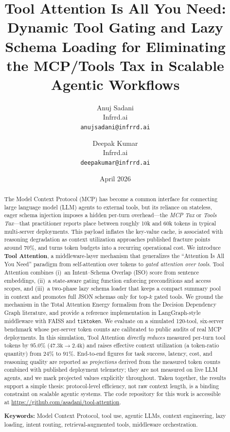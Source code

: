 \documentclass[11pt]{article}
\title{Tool Attention Is All You Need: \\
  Dynamic Tool Gating and Lazy Schema Loading for Eliminating \\
  the MCP/Tools Tax in Scalable Agentic Workflows}
\author{Anuj Sadani \\
  Infrrd.ai \\
  \texttt{anujsadani@infrrd.ai}
  \and
  Deepak Kumar \\
  Infrrd.ai \\
  \texttt{deepakumar@infrrd.ai}}
\date{April 2026}
\begin{document}
\maketitle

\begin{abstract}
The Model Context Protocol (MCP) has become a common interface for connecting large language model (LLM) agents to external tools, but its reliance on stateless, eager schema injection imposes a hidden per-turn overhead---the \emph{MCP Tax} or \emph{Tools Tax}---that practitioner reports place between roughly 10k and 60k tokens in typical multi-server deployments. This payload inflates the key-value cache, is associated with reasoning degradation as context utilization approaches published fracture points around $70\%$, and turns token budgets into a recurring operational cost. We introduce \textbf{Tool Attention}, a middleware-layer mechanism that generalizes the ``Attention Is All You Need'' paradigm from self-attention over tokens to \emph{gated attention over tools}. Tool Attention combines (i)~an Intent--Schema Overlap (ISO) score from sentence embeddings, (ii)~a state-aware gating function enforcing preconditions and access scopes, and (iii)~a two-phase lazy schema loader that keeps a compact summary pool in context and promotes full JSON schemas only for top-$k$ gated tools. We ground the mechanism in the Total Attention Energy formalism from the Decision Dependency Graph literature, and provide a reference implementation in LangGraph-style middleware with FAISS and \texttt{tiktoken}. We evaluate on a simulated 120-tool, six-server benchmark whose per-server token counts are calibrated to public audits of real MCP deployments. In this simulation, Tool Attention \emph{directly reduces} measured per-turn tool tokens by $95.0\%$ ($47.3\text{k}\!\to\!2.4\text{k}$) and raises effective context utilization (a token-ratio quantity) from $24\%$ to $91\%$. End-to-end figures for task success, latency, cost, and reasoning quality are reported as \emph{projections} derived from the measured token counts combined with published deployment telemetry; they are not measured on live LLM agents, and we mark projected values explicitly throughout. Taken together, the results support a simple thesis: protocol-level efficiency, not raw context length, is a binding constraint on scalable agentic systems. The code repository for this work is accessible at \url{https://github.com/asadani/tool-attention}.

\vspace{0.5em}
\noindent\textbf{Keywords:} Model Context Protocol, tool use, agentic LLMs, context engineering, lazy loading, intent routing, retrieval-augmented tools, middleware orchestration.
\end{abstract}
\end{document}
